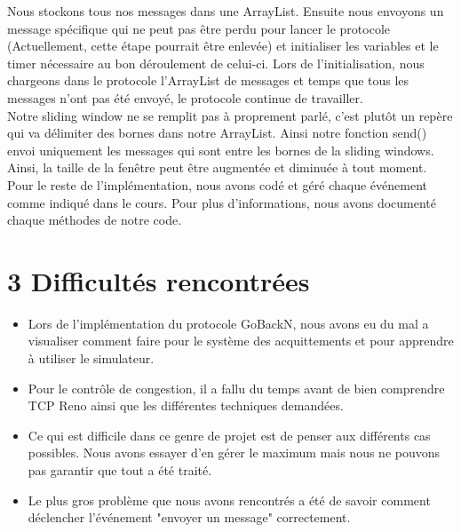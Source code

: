 \documentclass{report}
\begin{document}
Nous stockons tous nos messages dans une ArrayList. Ensuite nous envoyons un message spécifique qui ne peut pas être perdu pour lancer le protocole (Actuellement, cette étape pourrait être enlevée) et 
initialiser les variables et le timer nécessaire au bon déroulement de celui-ci. Lors de l'initialisation, nous chargeons dans le protocole l'ArrayList de messages et temps que tous les messages 
n'ont pas été envoyé, le protocole continue de travailler.\\

Notre sliding window ne se remplit pas à proprement parlé, c'est plutôt un repère qui va délimiter des bornes dans notre ArrayList. Ainsi notre fonction send() envoi uniquement les messages 
qui sont entre les bornes de la sliding windows. Ainsi, la taille de la fenêtre peut être augmentée et diminuée à tout moment.\\

Pour le reste de l'implémentation, nous avons codé et géré chaque événement comme indiqué dans le cours. Pour plus d'informations, nous avons documenté chaque méthodes de notre code.



\section*{3 Difficultés rencontrées}
\begin{itemize}
\item Lors de l'implémentation du protocole GoBackN, nous avons eu du mal a visualiser comment faire pour le système des acquittements et pour apprendre à utiliser le simulateur.
\item Pour le contrôle de congestion, il a fallu du temps avant de bien comprendre TCP Reno ainsi que les différentes techniques demandées.
\item Ce qui est difficile dans ce genre de projet est de penser aux différents cas possibles. Nous avons essayer d'en gérer le maximum mais nous ne pouvons pas garantir que tout a été traité.
\item Le plus gros problème que nous avons rencontrés a été de savoir comment déclencher l’événement "envoyer un message" correctement.
\end{itemize}
\end{document}
